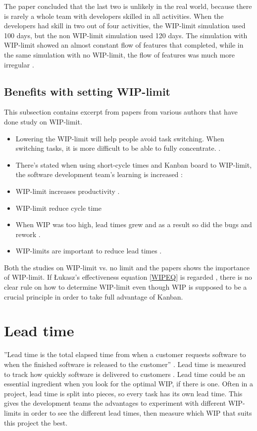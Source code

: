 \documentclass[UKenglish]{ifimaster}  %
\begin{document}
The paper concluded that the last two is unlikely in the real world, because there is rarely a whole team with developers skilled in all activities. 
When the developers had skill in two out of four activities, the WIP-limit simulation used 100 days, but the non WIP-limit simulation used 120 days. The simulation with WIP-limit showed an almost constant flow of features that completed, while in the same simulation with no WIP-limit, the flow of features was much more irregular \parencite{DavidAnderson}.

\subsection{Benefits with setting WIP-limit}
\label{sub:sub:benefits}
This subsection contains excerpt from papers from various authors that have done study on WIP-limit. 

\begin{itemize}
\item Lowering the WIP-limit will help people avoid task switching. When switching tasks, it is more difficult to be able to fully concentrate. \parencite{Ikonen}.
\item There's stated when using short-cycle times and Kanban board to WIP-limit, the software development team's learning is increased \parencite{Joyce}:
\item WIP-limit increases productivity \parencite{Joyce}.
\item WIP-limit reduce cycle time \parencite{Ola}
\item When WIP was too high, lead times grew and as a result so did the bugs and rework \parencite{Shinkle}.
\vspace{-0.3em}
\item  WIP-limits are important to reduce lead times \parencite{KanbanWay}.
\end{itemize}

Both the studies on WIP-limit vs. no limit and the papers shows the importance of WIP-limit. If  \L ukasz's effectiveness equation \ref{WIPEQ} is regarded , there is no clear rule on how to determine WIP-limit even though WIP is supposed to be a crucial principle in order to take full advantage of Kanban.

\section {Lead time}
\label{sec:in:lt}
''Lead time is the total elapsed time from when a customer requests software to when the finished software is released to the customer'' \parencite{Joyce}. Lead time is measured to track how quickly software is delivered to customers \parencite{Joyce}. Lead time could be an essential ingredient when you look for the optimal WIP, if there is one.  Often in a project, lead time is split into pieces, so every task has its own lead time. This gives the development teams the advantages to experiment with different WIP-limits in order to see the different lead times, then measure which WIP that suits this project the best. 
\end{document}
